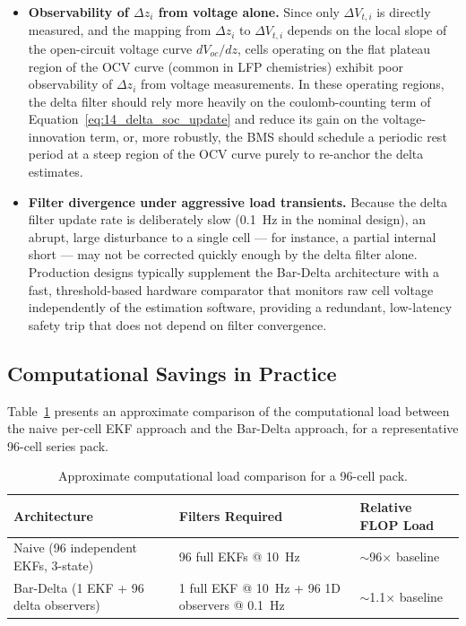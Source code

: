 \begin{itemize}
    \item \textbf{Observability of $\Delta z_i$ from voltage alone.} Since only $\Delta V_{t,i}$ is directly measured, and the mapping from $\Delta z_i$ to $\Delta V_{t,i}$ depends on the local slope of the open-circuit voltage curve $dV_{oc}/dz$, cells operating on the flat plateau region of the OCV curve (common in LFP chemistries) exhibit poor observability of $\Delta z_i$ from voltage measurements. In these operating regions, the delta filter should rely more heavily on the coulomb-counting term of Equation~\ref{eq:14_delta_soc_update} and reduce its gain on the voltage-innovation term, or, more robustly, the BMS should schedule a periodic rest period at a steep region of the OCV curve purely to re-anchor the delta estimates.
    \item \textbf{Filter divergence under aggressive load transients.} Because the delta filter update rate is deliberately slow (0.1~Hz in the nominal design), an abrupt, large disturbance to a single cell — for instance, a partial internal short — may not be corrected quickly enough by the delta filter alone. Production designs typically supplement the Bar-Delta architecture with a fast, threshold-based hardware comparator that monitors raw cell voltage independently of the estimation software, providing a redundant, low-latency safety trip that does not depend on filter convergence.
\end{itemize}

\subsection{Computational Savings in Practice}
\label{subsec:14_savings}

Table~\ref{tab:14_computation_savings} presents an approximate comparison of the computational load between the naive per-cell EKF approach and the Bar-Delta approach, for a representative 96-cell series pack.

\begin{table}[htbp]
\centering
\caption{Approximate computational load comparison for a 96-cell pack.}
\label{tab:14_computation_savings}
\renewcommand{\arraystretch}{1.4}
\begin{tabularx}{\textwidth}{@{}l X X@{}}
\toprule
\textbf{Architecture} & \textbf{Filters Required} & \textbf{Relative FLOP Load} \\
\midrule
Naive (96 independent EKFs, 3-state) & 96 full EKFs @ 10~Hz & $\sim$96$\times$ baseline \\
Bar-Delta (1 EKF + 96 delta observers) & 1 full EKF @ 10~Hz + 96 1D observers @ 0.1~Hz & $\sim$1.1$\times$ baseline \\
\bottomrule
\end{tabularx}
\end{table}

